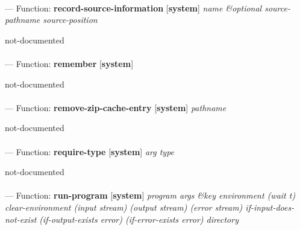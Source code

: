 \paragraph{}
\label{SYSTEM:RECORD-SOURCE-INFORMATION}
--- Function: \textbf{record-source-information} [\textbf{system}] \textit{name \&optional source-pathname source-position}

\begin{adjustwidth}{5em}{5em}
not-documented
\end{adjustwidth}

\paragraph{}
\label{SYSTEM:REMEMBER}
--- Function: \textbf{remember} [\textbf{system}] \textit{}

\begin{adjustwidth}{5em}{5em}
not-documented
\end{adjustwidth}

\paragraph{}
\label{SYSTEM:REMOVE-ZIP-CACHE-ENTRY}
--- Function: \textbf{remove-zip-cache-entry} [\textbf{system}] \textit{pathname}

\begin{adjustwidth}{5em}{5em}
not-documented
\end{adjustwidth}

\paragraph{}
\label{SYSTEM:REQUIRE-TYPE}
--- Function: \textbf{require-type} [\textbf{system}] \textit{arg type}

\begin{adjustwidth}{5em}{5em}
not-documented
\end{adjustwidth}

\paragraph{}
\label{SYSTEM:RUN-PROGRAM}
--- Function: \textbf{run-program} [\textbf{system}] \textit{program args \&key environment (wait t) clear-environment (input stream) (output stream) (error stream) if-input-does-not-exist (if-output-exists error) (if-error-exists error) directory}

